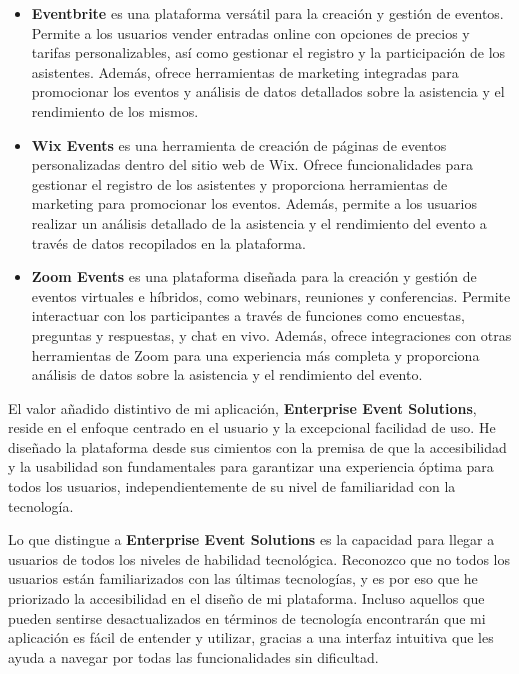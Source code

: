 \begin{itemize}
    \item \textbf{Eventbrite} es una plataforma versátil para la creación y gestión de eventos. Permite a los usuarios vender entradas online 
    con opciones de precios y tarifas personalizables, así como gestionar el registro y la participación de los asistentes. Además, 
    ofrece herramientas de marketing integradas para promocionar los eventos y análisis de datos detallados sobre la asistencia y 
    el rendimiento de los mismos.
    \item \textbf{Wix Events} es una herramienta de creación de páginas de 
    eventos personalizadas dentro del sitio web de Wix. Ofrece funcionalidades para gestionar el registro de los asistentes y 
    proporciona herramientas de marketing para promocionar los eventos. Además, permite a los usuarios realizar un análisis 
    detallado de la asistencia y el rendimiento del evento a través de datos recopilados en la plataforma.
    \item \textbf{Zoom Events} es una plataforma diseñada para la creación y gestión de eventos virtuales e híbridos, como webinars, 
    reuniones y conferencias. Permite interactuar con los participantes a través de funciones como encuestas, preguntas y respuestas, 
    y chat en vivo. Además, ofrece integraciones con otras herramientas de Zoom para una experiencia más completa y proporciona análisis 
    de datos sobre la asistencia y el rendimiento del evento.
\end{itemize}

El valor añadido distintivo de mi aplicación, \textbf{Enterprise Event Solutions}, reside en el enfoque centrado en el usuario y la excepcional 
facilidad de uso. He diseñado la plataforma desde sus cimientos con la premisa de que la accesibilidad y la usabilidad son fundamentales 
para garantizar una experiencia óptima para todos los usuarios, independientemente de su nivel de familiaridad con la tecnología.

Lo que distingue a \textbf{Enterprise Event Solutions} es la capacidad para llegar a usuarios de todos los niveles de habilidad tecnológica. 
Reconozco que no todos los usuarios están familiarizados con las últimas tecnologías, y es por eso que he priorizado la accesibilidad en el 
diseño de mi plataforma. Incluso aquellos que pueden sentirse desactualizados en términos de tecnología encontrarán que mi aplicación es fácil 
de entender y utilizar, gracias a una interfaz intuitiva que les ayuda a navegar por todas las funcionalidades sin dificultad.

